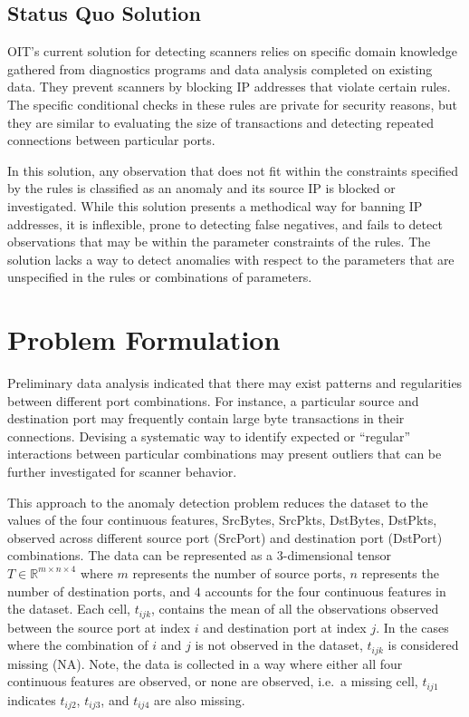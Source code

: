 \documentclass[12pt,twoside]{dukestatscithesis}
\theoremstyle{definition}
\theoremstyle{definition}
\theoremstyle{definition}
\theoremstyle{remark}
\begin{document}
\subsection{Status Quo Solution}\label{status-quo-solution}

OIT's current solution for detecting scanners relies on specific domain
knowledge gathered from diagnostics programs and data analysis completed
on existing data. They prevent scanners by blocking IP addresses that
violate certain rules. The specific conditional checks in these rules
are private for security reasons, but they are similar to evaluating the
size of transactions and detecting repeated connections between
particular ports.

In this solution, any observation that does not fit within the
constraints specified by the rules is classified as an anomaly and its
source IP is blocked or investigated. While this solution presents a
methodical way for banning IP addresses, it is inflexible, prone to
detecting false negatives, and fails to detect observations that may be
within the parameter constraints of the rules. The solution lacks a way
to detect anomalies with respect to the parameters that are unspecified
in the rules or combinations of parameters.

\section{Problem Formulation}\label{problem-formulation}

Preliminary data analysis indicated that there may exist patterns and
regularities between different port combinations. For instance, a
particular source and destination port may frequently contain large byte
transactions in their connections. Devising a systematic way to identify
expected or ``regular'' interactions between particular combinations may
present outliers that can be further investigated for scanner behavior.

This approach to the anomaly detection problem reduces the dataset to
the values of the four continuous features, SrcBytes, SrcPkts, DstBytes,
DstPkts, observed across different source port (SrcPort) and destination
port (DstPort) combinations. The data can be represented as a
3-dimensional tensor \(T \in \mathbb{R}^{m \times n \times 4}\) where
\(m\) represents the number of source ports, \(n\) represents the number
of destination ports, and \(4\) accounts for the four continuous
features in the dataset. Each cell, \(t_{ijk}\), contains the mean of
all the observations observed between the source port at index \(i\) and
destination port at index \(j\). In the cases where the combination of
\(i\) and \(j\) is not observed in the dataset, \(t_{ijk}\) is
considered missing (NA). Note, the data is collected in a way where
either all four continuous features are observed, or none are observed,
i.e.~a missing cell, \(t_{ij1}\) indicates \(t_{ij2}\), \(t_{ij3}\), and
\(t_{ij4}\) are also missing.
\end{document}
